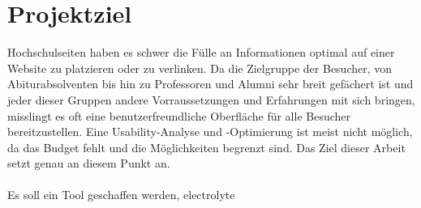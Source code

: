 %
%
%
%

\section{Projektziel}

Hochschulseiten haben es schwer die Fülle an Informationen optimal auf einer Website zu platzieren oder zu verlinken. Da die Zielgruppe der Besucher, von Abiturabsolventen bis hin zu Professoren und Alumni sehr breit gefächert ist und jeder dieser Gruppen andere Vorraussetzungen und Erfahrungen mit sich bringen, misslingt es oft eine benutzerfreundliche Oberfläche für alle Besucher bereitzustellen. Eine Usability-Analyse und -Optimierung ist meist nicht möglich, da das Budget fehlt und die Möglichkeiten begrenzt sind. Das Ziel dieser Arbeit setzt genau an diesem Punkt an.\\
\\
Es soll ein Tool geschaffen werden, \Gls{electrolyte} 
